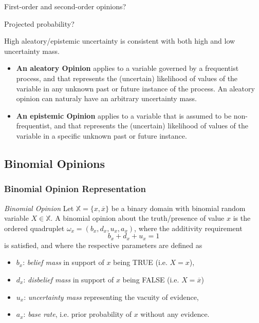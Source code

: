 \begin{question}
	First-order and second-order opinions?
\end{question}

\begin{question}
	Projected probability?
\end{question}

High aleatory/epistemic uncertainty is consistent with both high and low uncertainty mass.

\begin{itemize}
	\item \textbf{An aleatory Opinion} applies to a variable governed by a frequentist process, and that represents the (uncertain) likelihood of values of the variable in any unknown past or future instance of the process. An aleatory opinion can naturaly have an arbitrary uncertainty mass.
	\item \textbf{An epistemic Opinion} applies to a variable that is assumed to be non-frequentist,
and that represents the (uncertain) likelihood of values of the variable in a specific unknown past or future instance.
\end{itemize}

\subsection{Binomial Opinions}

\subsubsection{Binomial Opinion Representation}

\begin{definition}
	\emph{Binomial Opinion} Let $\mathbb{X} = \{x, \overline{x}\}$ be a binary domain with binomial random variable $X \in \mathbb{X}$. A binomial opinion about the truth/presence of value $x$ is the ordered quadruplet $\omega_x = \left(b_x, d_x, u_x, a_x\right)$, where the additivity requirement
	\begin{equation}
		b_x + d_x + u_x = 1
	\end{equation}
	is satisfied, and where the respective parameters are defined as
	\begin{itemize}
		\item $b_x$: \emph{belief mass} in support of $x$ being TRUE (i.e. $X = x$),
		\item $d_x$: \emph{disbelief mass} in support of $x$ being FALSE (i.e. $X = \overline{x}$)
		\item $u_x$: \emph{uncertainty mass} representing the vacuity of evidence,
		\item $a_x$: \emph{base rate}, i.e. prior probability of $x$ without any evidence.
	\end{itemize}
\end{definition}

